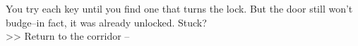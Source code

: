 You try each key until you find one that turns the lock. But the door still won’t budge--in fact, it was already unlocked. Stuck?\\

>> Return to the corridor -- 